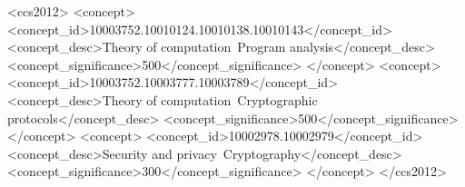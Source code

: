 \documentclass[sigconf, screen, natbib=false, dvipsnames, table]{acmart}
\theoremstyle{definition}
\begin{document}
%

\renewcommand{\A}{{\sf A}}
\renewcommand{\B}{{\sf B}}
\renewcommand{\C}{{\sf C}}
\renewcommand{\D}{{\sf D}}


\begin{abstract}


\end{abstract}


%
%
\begin{CCSXML}
<ccs2012>
<concept>
<concept_id>10003752.10010124.10010138.10010143</concept_id>
<concept_desc>Theory of computation~Program analysis</concept_desc>
<concept_significance>500</concept_significance>
</concept>
<concept>
<concept_id>10003752.10003777.10003789</concept_id>
<concept_desc>Theory of computation~Cryptographic protocols</concept_desc>
<concept_significance>500</concept_significance>
</concept>
<concept>
<concept_id>10002978.10002979</concept_id>
<concept_desc>Security and privacy~Cryptography</concept_desc>
<concept_significance>300</concept_significance>
</concept>
</ccs2012>
\end{CCSXML}


%

%
\maketitle
\end{document}
